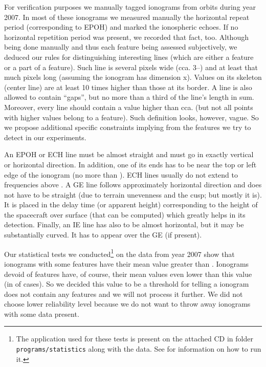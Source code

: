 For verification purposes we manually tagged  ionograms from  orbits during year 2007. In most of these ionograms we measured manually the horizontal repeat period (corresponding to EPOH) and marked the ionospheric echoes. If no horizontal repetition period was present, we recorded that fact, too. Although being done manually and thus each feature being assessed subjectively, we deduced our rules for distinguishing interesting lines (which are either a feature or a part of a feature). Such line is several pixels wide (cca. 3--) and at least that much pixels long (assuming the ionogram has dimension x). Values on its skeleton (center line) are at least 10 times higher than those at its border. A line is also allowed to contain ``gaps'', but no more than a third of the line's length in sum. Moreover, every line should contain a value higher than cca.  (but not all points with higher values belong to a feature). Such definition looks, however, vague. So we propose additional specific constraints implying from the features we try to detect in our experiments. 

An EPOH or ECH line must be almost straight and must go in exactly vertical or horizontal direction. In addition, one of its ends has to be near the top or left edge of the ionogram (no more than ). ECH lines usually do not extend to frequencies above . A GE line follows approximately horizontal direction and does not have to be straight (due to terrain unevenness and the cusp; but mostly it is). It is placed in the delay time (or apparent height) corresponding to the height of the spacecraft over surface (that can be computed) which greatly helps in its detection. Finally, an IE line has also to be almost horizontal, but it may be substantially curved. It has to appear over the GE (if present).

Our statistical tests we conducted\footnote{The application used for these tests is present on the attached CD in folder \texttt{programs/statistics} along with the data. See  for information on how to run it.} on the data from year 2007 show that  ionograms with some features have their mean value greater than . Ionograms devoid of features have, of course, their mean values even lower than this value (in  of cases). So we decided this value to be a threshold for telling a ionogram does not contain any features and we will not process it further. We did not choose lower reliability level because we do not want to throw away ionograms with some data present.

